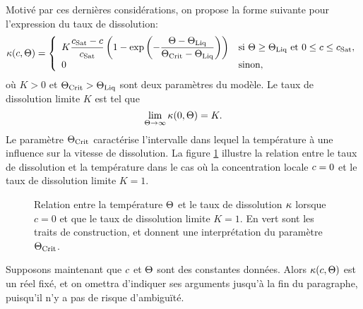 Motivé par ces dernières considérations, on propose la forme suivante
pour l'expression du taux de dissolution:
\begin{equation}\label{eq:dissolution-rate}
  \kappa(c, \Theta) =
  \left\{
  \begin{array}{ll}
    K\displaystyle\frac{c_\text{Sat} - c}{c_\text{Sat}}\left( 1 -
      \exp\left( -\displaystyle\frac{\Theta - \Theta_\text{Liq}}{\Theta_\text{Crit} -
          \Theta_\text{Liq}} \right) \right) & \text{si }\Theta \geq \Theta_\text{Liq}\text{ et }
    0\leq c
    \leq c_\text{Sat},\\
    0                                     & \text{sinon,}
  \end{array}
  \right.
\end{equation}
où $K > 0$ et $\Theta_\text{Crit} > \Theta_\text{Liq}$ sont deux paramètres du modèle. Le taux
de dissolution limite $K$ est tel que
\begin{equation}
  \lim_{\Theta \to\infty}\kappa(0, \Theta) = K.
\end{equation}
Le paramètre $\Theta_\text{Crit}$ caractérise l'intervalle dans lequel la
température à une influence sur la vitesse de dissolution. La figure
\ref{fig:diss-rate} illustre la relation entre le taux de dissolution
et la température dans le cas où la concentration locale
$c = 0$ et le taux de dissolution limite $K = 1$.

\begin{figure}[h]
  \begin{center}
    
    \caption{Relation entre la température $\Theta$ et le taux de
      dissolution $\kappa$ lorsque $c = 0$ et que le taux
      de dissolution limite $K = 1$. En vert sont les traits de
      construction, et donnent une interprétation du paramètre
      $\Theta_\text{Crit}$.}
    \label{fig:diss-rate}
  \end{center}
\end{figure}

Supposons maintenant que $c$ et $\Theta$ sont des
constantes données. Alors
$\kappa(c,\Theta)$ est un réel fixé, et
on omettra d'indiquer ses arguments jusqu'à la fin du paragraphe,
puisqu'il n'y a pas de risque d'ambiguïté.


